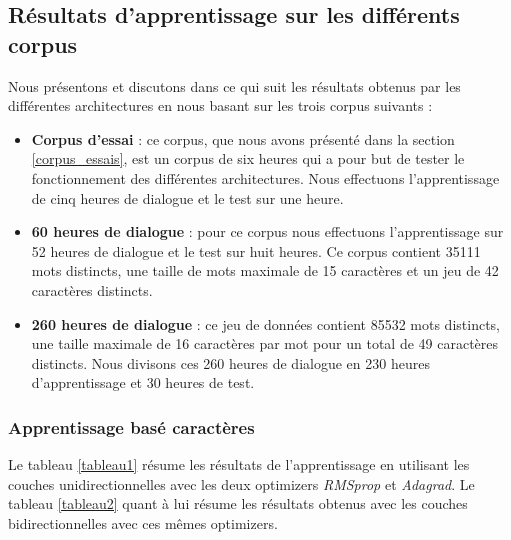 \subsection{Résultats d'apprentissage sur les différents corpus}
Nous présentons et discutons dans ce qui suit les résultats obtenus par les différentes architectures en nous basant sur les trois corpus suivants :
\begin{itemize}
    \item \textbf{Corpus d'essai} : ce corpus, que nous avons présenté dans la section \ref{corpus_essais}, est un corpus de six heures qui a pour but de tester le fonctionnement des différentes architectures. Nous effectuons l'apprentissage de cinq heures de dialogue et le test sur une heure.
    \item \textbf{60 heures de dialogue} : pour ce corpus nous effectuons l'apprentissage sur 52 heures de dialogue et le test sur huit heures. Ce corpus contient 35111 mots distincts, une taille de mots maximale de 15 caractères et un jeu de 42 caractères distincts.
    \item \textbf{260 heures de dialogue} : ce jeu de données contient 85532 mots distincts, une taille maximale de 16 caractères par mot pour un total de 49 caractères distincts. Nous divisons ces 260 heures de dialogue en 230 heures d'apprentissage et 30 heures de test.
\end{itemize}

\subsubsection{Apprentissage basé caractères}
Le tableau \ref{tableau1} résume les résultats de l'apprentissage en utilisant les couches unidirectionnelles avec les deux optimizers \textit{RMSprop} et \textit{Adagrad}. Le tableau \ref{tableau2} quant à lui résume les résultats obtenus avec les couches bidirectionnelles avec ces mêmes optimizers.

